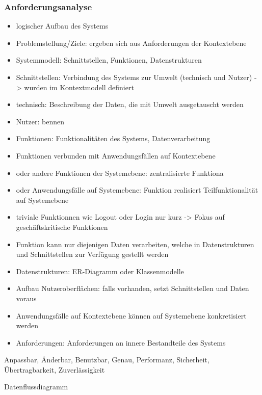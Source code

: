 \subsubsection{Anforderungsanalyse}
\begin{itemize}
  \item logischer Aufbau des Systems
  \item Problemstellung/Ziele: ergeben sich aus Anforderungen der Kontextebene
  \item Systemmodell: Schnittstellen, Funktionen, Datenstrukturen
  \item Schnittstellen: Verbindung des Systems zur Umwelt (technisch und Nutzer) -> wurden im Kontextmodell definiert
  \item technisch: Beschreibung der Daten, die mit Umwelt ausgetauscht werden
  \item Nutzer: bennen
  \item Funktionen: Funktionalitäten des Systems, Datenverarbeitung
  \item Funktionen verbunden mit Anwendungsfällen auf Kontextebene
  \item oder andere Funktionen der Systemebene: zentralisierte Funktiona
  \item oder Anwendungsfälle auf Systemebene: Funktion realisiert Teilfunktionalität auf Systemebene
  \item triviale Funktionnen wie Logout oder Login nur kurz -> Fokus auf geschäftskritische Funktionen
  \item Funktion kann nur diejenigen Daten verarbeiten, welche in Datenstrukturen und Schnittstellen zur Verfügung gestellt werden
  \item Datenstrukturen: ER-Diagramm oder Klassenmodelle
  \item Aufbau Nutzeroberflächen: falls vorhanden, setzt Schnittstellen und Daten voraus
  \item Anwendungsfälle auf Kontextebene können auf Systemebene konkretisiert werden
  \item Anforderungen: Anforderungen an innere Bestandteile des Systems
\end{itemize}
Anpassbar, Änderbar, Benutzbar, Genau, Performanz, Sicherheit, Übertragbarkeit, Zuverlässigkeit

Datenflussdiagramm
